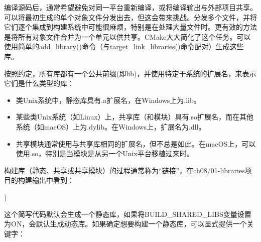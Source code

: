 
编译源码后，通常希望避免对同一平台重新编译，或将编译输出与外部项目共享。可以将最初生成的单个对象文件分发出去，但这会带来挑战。分发多个文件，并将它们逐个集成到构建系统中可能很麻烦，特别是在处理大量文件时。更有效的方法是将所有对象文件合并为一个单元以供共享。CMake大大简化了这个任务。可以使用简单的add\_library()命令（与target\_link\_libraries()命令配对）生成这些库。

按照约定，所有库都有一个公共前缀(即lib)，并使用特定于系统的扩展名，来表示它们是什么类型的库：

\begin{itemize}
\item
类Unix系统中，静态库具有.a扩展名，在Windows上为.lib。

\item
某些类Unix系统（如Linux）上，共享库（和模块）具有.so扩展名，而在其他系统（如macOS）上为.dylib。在Windows上，扩展名为.dll。

\item
共享模块通常使用与共享库相同的扩展名，但不总是如此。在macOS上，可以使用.so，特别是当模块是从另一个Unix平台移植过来时。
\end{itemize}

构建库（静态、共享或共享模块）的过程通常称为“链接”，在ch08/01-libraries项目的构建输出中看到：

)
\end{shell}

这个简写代码默认会生成一个静态库，如果将BUILD\_SHARED\_LIBS变量设置为ON，会默认生成动态库。如果确定想要构建一个静态库，可以显式提供一个关键字：

